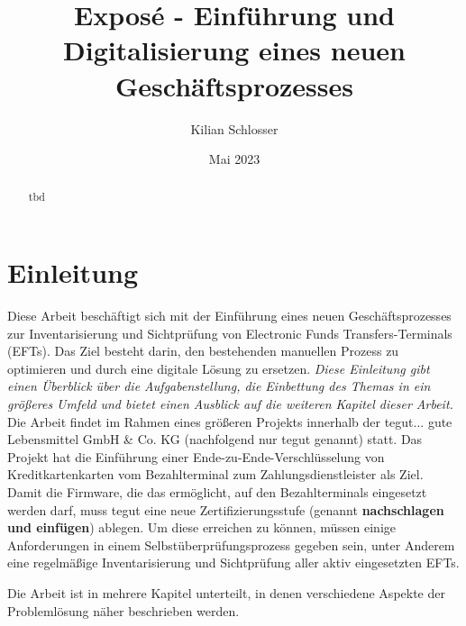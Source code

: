 \documentclass[12pt, a4paper]{article}
\title{Exposé - Einführung und Digitalisierung eines neuen Geschäftsprozesses}
\author{Kilian Schlosser}
\date{Mai 2023}
\begin{document}
\maketitle

\begin{abstract}
    tbd
\end{abstract}

\tableofcontents

\section{Einleitung}

Diese Arbeit beschäftigt sich mit der Einführung eines neuen Geschäftsprozesses zur Inventarisierung und Sichtprüfung von Electronic Funds Transfers-Terminals (EFTs). 
Das Ziel besteht darin, den bestehenden manuellen Prozess zu optimieren und durch eine digitale Lösung zu ersetzen. \textit{Diese Einleitung gibt einen Überblick über die 
Aufgabenstellung, die Einbettung des Themas in ein größeres Umfeld und bietet einen Ausblick auf die weiteren Kapitel dieser Arbeit.}
Die Arbeit findet im Rahmen eines größeren Projekts innerhalb der tegut... gute Lebensmittel GmbH \& Co. KG (nachfolgend nur tegut genannt) statt. Das Projekt hat die Einführung
einer Ende-zu-Ende-Verschlüsselung von Kreditkartenkarten vom Bezahlterminal zum Zahlungsdienstleister als Ziel. Damit die Firmware, die das ermöglicht, auf den Bezahlterminals
eingesetzt werden darf, muss tegut eine neue Zertifizierungsstufe (genannt \textbf{nachschlagen und einfügen}) ablegen. Um diese erreichen zu können, müssen einige Anforderungen
in einem Selbstüberprüfungsprozess gegeben sein, unter Anderem eine regelmäßige Inventarisierung und Sichtprüfung aller aktiv eingesetzten EFTs.

Die Arbeit ist in mehrere Kapitel unterteilt, in denen verschiedene Aspekte der Problemlösung näher beschrieben werden.
\end{document}

